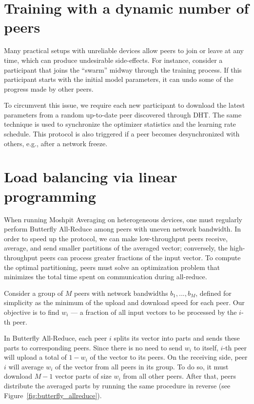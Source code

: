 \section{Training with a dynamic number of peers}
\label{sect:load_state_from_peers}

Many practical setups with unreliable devices allow peers to join or leave at any time, which can produce undesirable side-effects. For instance, consider a participant that joins the ``swarm'' midway through the training process. If this participant starts with the initial model parameters, it can undo some of the progress made by other peers.

To circumvent this issue, we require each new participant to download the latest parameters from a random up-to-date peer discovered through DHT. The same technique is used to synchronize the optimizer statistics and the learning rate schedule. This protocol is also triggered if a peer becomes desynchronized with others, e.g., after a network freeze.

\section{Load balancing via linear programming}
\label{sect:load_balancing}

When running Moshpit Averaging on heterogeneous devices, one must regularly perform Butterfly All-Reduce among peers with uneven network bandwidth.
In order to speed up the protocol, we can make low-throughput peers receive, average, and send smaller partitions of the averaged vector; conversely, the high-throughput peers can process greater fractions of the input vector.
To compute the optimal partitioning, peers must solve an optimization problem that minimizes the total time spent on communication during all-reduce.

Consider a group of $M$ peers with network bandwidths $b_1, ..., b_M$, defined for simplicity as the minimum of the upload and download speed for each peer. Our objective is to find $w_i$ --- a fraction of all input vectors to be processed by the $i$-th peer.

In Butterfly All-Reduce, each peer $i$ splits its vector into parts and sends these parts to corresponding peers. Since there is no need to send $w_i$ to itself, $i$-th peer will upload a total of $1 - w_i$ of the vector to its peers.
On the receiving side, peer $i$ will average $w_i$ of the vector from all peers in its group. To do so, it must download $M-1$ vector parts of size $w_i$ from all other peers.
After that, peers distribute the averaged parts by running the same procedure in reverse (see Figure~\ref{fig:butterfly_allreduce}).


